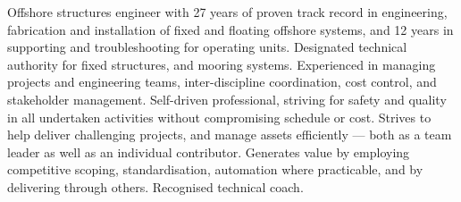 \noindent Offshore structures engineer with 27 years of proven track record in engineering, fabrication and installation of fixed and floating offshore systems, and 12 years in supporting and troubleshooting for operating units. Designated technical authority for fixed structures, and mooring systems. Experienced in managing projects and engineering teams, inter-discipline coordination, cost control, and stakeholder management. Self-driven professional, striving for safety and quality in all undertaken activities without compromising schedule or cost. Strives to help deliver challenging projects, and manage assets efficiently --- both as a team leader as well as an individual contributor. Generates value by employing competitive scoping, standardisation, automation where practicable, and by delivering through others. Recognised technical coach.